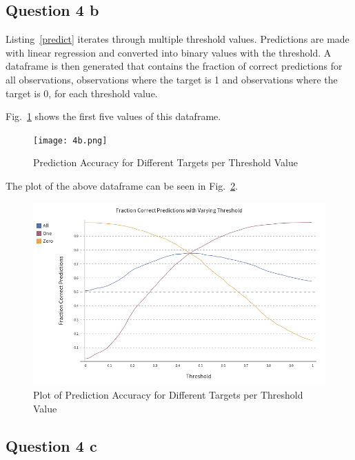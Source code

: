 \documentclass[a4paper,12pt]{article}
\numberwithin{equation}{section}
\numberwithin{figure}{section}
\numberwithin{table}{section}
\begin{document}
\subsection{Question 4 b}

Listing~\ref{predict} iterates through multiple threshold values. Predictions are made with linear regression and converted into binary values with the threshold. A dataframe is then generated that contains the fraction of correct predictions for all observations, observations where the target is 1 and observations where the target is 0, for each threshold value. \par 
Fig.~\ref{fig:4b} shows the first five values of this dataframe.

\begin{figure}[!htb]
    \centering
    \texttt{[image: 4b.png]}
    \caption{Prediction Accuracy for Different Targets per Threshold Value}
    \label{fig:4b}
\end{figure}
\FloatBarrier

The plot of the above dataframe can be seen in Fig.~\ref{fig:predict}. 

\begin{figure}[!htb]
    \centering
    \includegraphics[width=0.95\linewidth]{../../predict.png}
    \caption{Plot of Prediction Accuracy for Different Targets per Threshold Value}
    \label{fig:predict}
\end{figure}
\FloatBarrier

\subsection{Question 4 c}


\end{document}
